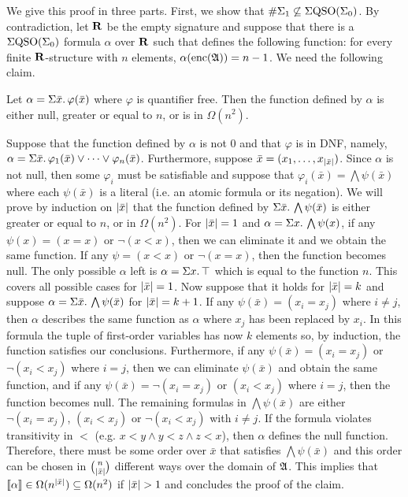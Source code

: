 We give this proof in three parts.
First, we show that $\#\Sigma_{1} \not\subseteq \Sigma{\rm QSO}(\Sigma_{0})$. By contradiction, let $\mathbf{R}$ be the empty signature and suppose that there is a $\Sigma{\rm QSO}(\Sigma_{0})$ formula $\alpha$ over $\mathbf{R}$ such that defines the following function: for every finite $\mathbf{R}$-structure with $n$ elements, $\alpha({\rm enc}(\mathfrak{A})) = n - 1$. We need the following claim.
\begin{clm}
	Let $\alpha = \Sigma{\bar{x}}.\,\varphi(\bar{x})$	where $\varphi$ is quantifier free. Then the function defined by $\alpha$ is either null, greater or equal to $n$, or is in $\Omega(n^2)$.
\end{clm}
\proof
	Suppose that the function defined by $\alpha$ is not $0$ and that $\varphi$ is in DNF, namely, $\alpha = \Sigma{\bar{x}}.\, \varphi_1(\bar{x}) \vee \cdots \vee \varphi_n(\bar{x})$. Furthermore, suppose $\bar{x} = (x_1,\ldots,x_{\vert \bar{x} \vert})$. Since $\alpha$ is not null, then some $\varphi_i$ must be satisfiable and suppose that $\varphi_i(\bar{x}) = \bigwedge\psi(\bar{x})$ where each $\psi(\bar{x})$ is a literal (i.e. an atomic formula or its negation).
	We will prove by induction on $\vert \bar{x} \vert$ that the function defined by $\Sigma{\bar{x}}.\, \bigwedge\psi(\bar{x})$ is either greater or equal to $n$, or in $\Omega(n^2)$.
	For $\vert \bar{x} \vert= 1$ and $\alpha = \Sigma{x}.\,\bigwedge\psi(x)$, if any $\psi(x) = (x = x)$ or $\neg(x < x)$, then we can eliminate it and we obtain the same function. If any $\psi = (x < x)$ or $\neg(x=x)$, then the function becomes null. The only possible $\alpha$ left is $\alpha = \Sigma{x}.\,\top$ which is equal to the function $n$. This covers all possible cases for $\vert \bar{x} \vert = 1$. 
	Now suppose that it holds for $\vert \bar{x} \vert = k$ and suppose $\alpha = \Sigma{\bar{x}}.\,\bigwedge\psi(\bar{x})$ for $\vert \bar{x} \vert = k+1$. If any $\psi(\bar{x}) = (x_i = x_j)$ where $i \neq j$, then $\alpha$ describes the same function as $\alpha$ where $x_j$ has been replaced by $x_i$. In this formula the tuple of first-order variables has now $k$ elements so, by induction, the function satisfies our conclusions. Furthermore, if any $\psi(\bar{x}) = (x_i = x_j)$ or $\neg (x_i < x_j)$ where $i = j$, then we can eliminate $\psi(\bar{x})$ and obtain the same function, and if any $\psi(\bar{x}) = \neg(x_i = x_j)$ or $(x_i < x_j)$ where $i = j$, then the function becomes null. 
	The remaining formulas in $\bigwedge\psi(\bar{x})$ are either $\neg(x_i = x_j)$, $(x_i<x_j)$ or $\neg(x_i<x_j)$ with $i \neq j$. If the formula violates transitivity in $<$ (e.g. $x < y \wedge y < z \wedge z < x$), then $\alpha$ defines the null function. Therefore, there must be some order over $\bar{x}$ that satisfies $\bigwedge\psi(\bar{x})$ and this order can be chosen in  $\binom{n}{\vert \bar{x} \vert}$ different ways over the domain of $\mathfrak{A}$. This implies that ${\llbracket{}{\alpha}\rrbracket} \in \Omega(n^{\vert \bar{x} \vert}) \subseteq \Omega(n^2)$ if $\vert \bar{x} \vert > 1$ and concludes the proof of the claim.
